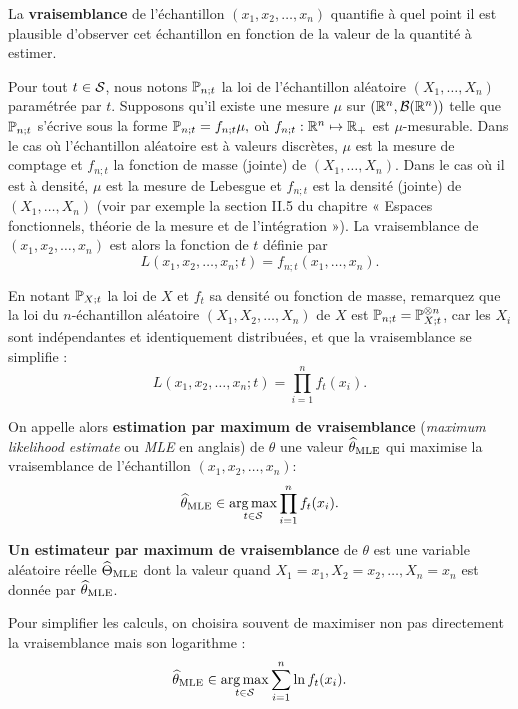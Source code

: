 La \textbf{vraisemblance} de l'échantillon $(x_1, x_2, \dots, x_n)$ quantifie à
quel point il est plausible d'observer cet échantillon en fonction de la valeur
de la quantité à estimer.

Pour tout $t \in \mathcal{S}$, nous notons $\mathbb{P}_{n;t}$ la loi de l'échantillon aléatoire $(X_1,\dots,X_n)$ paramétrée par
$t.$ Supposons qu'il existe une mesure $\mu$ sur $(\mathbb{R}^n, \mathcal{B}(\mathbb{R}^n))$ telle que
$\mathbb{P}_{n;t}$ s'écrive sous la forme $\mathbb{P}_{n;t}= f_{n;t} \mu,$ où
$f_{n;t}: \mathbb{R}^n \mapsto \mathbb{R}_+$ est $\mu$-mesurable. Dans le cas où l'échantillon aléatoire est à valeurs discrètes,
$\mu$ est la mesure de comptage et $f_{n;t}$ la fonction de masse (jointe) de $(X_1,\dots,X_n)$. Dans le
cas où il est à densité, $\mu$ est la mesure de Lebesgue et $f_{n;t}$ est la
densité (jointe) de $(X_1,\dots,X_n)$ (voir par exemple la section II.5 du chapitre « Espaces fonctionnels, théorie de la mesure
et de l'intégration »). La vraisemblance de $(x_1, x_2, \dots, x_n)$ est alors la
fonction de $t$ définie par
\begin{equation}
  L(x_1, x_2, \dots, x_n; t) = f_{n;t}(x_1,\dots,x_n).
  \label{eq:likelihood}
\end{equation}

En notant $\mathbb{P}_{X;t}$ la loi de $X$ et $f_{t}$ sa densité ou fonction de masse, remarquez que la loi du $n$-échantillon aléatoire $(X_1, X_2, \dots, X_n)$ de $X$ est 
$  \mathbb{P}_{n;t} = \mathbb{P}_{X; t}^{\otimes n} $,
car les $X_i$ sont indépendantes et identiquement distribuées, et que la vraisemblance se simplifie :
$$L(x_1, x_2, \dots, x_n; t) = \prod_{i=1}^n f_{t}(x_i).$$

On appelle alors \textbf{estimation par maximum de vraisemblance} ({\it maximum
  likelihood estimate} ou {\it MLE} en anglais) de $\theta$ une valeur
$\widehat{\theta}_{\text{MLE}}$ qui maximise la vraisemblance de l'échantillon
$(x_1, x_2, \dots, x_n)$:
\begin{equation}
  \label{eq:mle_estimator}
  \widehat{\theta}_{\text{MLE}} \in \operatorname*{arg\,max}_{t \in \mathcal{S}} \prod_{i=1}^n f_t(x_i).
\end{equation}

\textbf{Un estimateur par maximum de vraisemblance} de $\theta$ est une
variable aléatoire réelle $\widehat{\Theta}_{\text{MLE}}$ dont la valeur quand
$X_1=x_1, X_2=x_2, \dots, X_n=x_n$ est donnée par $\widehat{\theta}_{\text{MLE}}$.

Pour simplifier les calculs, on choisira souvent de maximiser non pas
directement la vraisemblance mais son logarithme :
\begin{equation}
  \label{eq:lmle_estimator} 
  \widehat{\theta}_{\text{MLE}} \in \operatorname*{arg\,max}_{t \in \mathcal{S}}\sum_{i=1}^n \ln f_t(x_i).
\end{equation}

